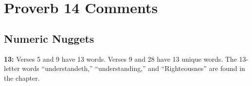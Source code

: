 \section{Proverb 14 Comments}

\subsection{Numeric Nuggets}
\textbf{13:} Verses 5 and 9 have 13 words. Verses 9 and 28 have 13 unique words. The 13-letter words ``understandeth,'' ``understanding,'' and ``Righteousnes'' are found in the chapter.

